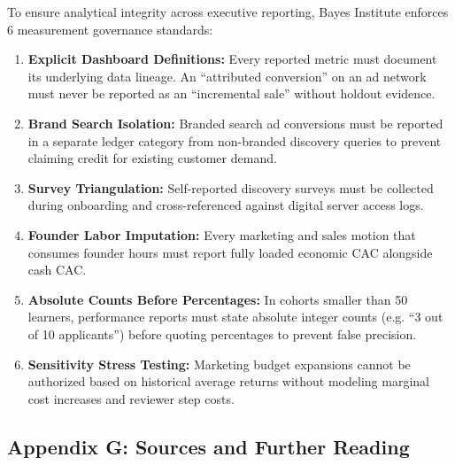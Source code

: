 To ensure analytical integrity across executive reporting, Bayes Institute enforces 6 measurement governance standards:
\begin{enumerate}[leftmargin=*,itemsep=1pt]
  \item \textbf{Explicit Dashboard Definitions:} Every reported metric must document its underlying data lineage. An ``attributed conversion'' on an ad network must never be reported as an ``incremental sale'' without holdout evidence.
  \item \textbf{Brand Search Isolation:} Branded search ad conversions must be reported in a separate ledger category from non-branded discovery queries to prevent claiming credit for existing customer demand.
  \item \textbf{Survey Triangulation:} Self-reported discovery surveys must be collected during onboarding and cross-referenced against digital server access logs.
  \item \textbf{Founder Labor Imputation:} Every marketing and sales motion that consumes founder hours must report fully loaded economic CAC alongside cash CAC.
  \item \textbf{Absolute Counts Before Percentages:} In cohorts smaller than 50 learners, performance reports must state absolute integer counts (e.g. ``3 out of 10 applicants'') before quoting percentages to prevent false precision.
  \item \textbf{Sensitivity Stress Testing:} Marketing budget expansions cannot be authorized based on historical average returns without modeling marginal cost increases and reviewer step costs.
\end{enumerate}

\subsection*{Appendix G: Sources and Further Reading}

